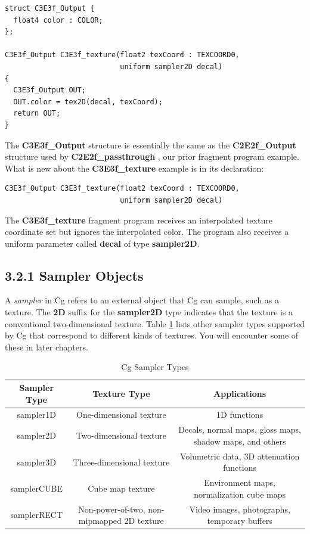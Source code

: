 \documentclass{book}
\begin{document}
\FloatBarrier
\begin{lstlisting}[caption=Example 3-3. The \textbf{C3E3f_texture} Fragment Program]
struct C3E3f_Output {
  float4 color : COLOR;
};

C3E3f_Output C3E3f_texture(float2 texCoord : TEXCOORD0,
                           uniform sampler2D decal)
{
  C3E3f_Output OUT;
  OUT.color = tex2D(decal, texCoord);
  return OUT;
}
\end{lstlisting}
\FloatBarrier

The \textbf{C3E3f_Output} structure is essentially the same as the \textbf{C2E2f_Output} structure used by \textbf{C2E2f_passthrough} , our prior fragment program example. What is new about the \textbf{C3E3f_texture} example is in its declaration:

\FloatBarrier
\begin{lstlisting}
C3E3f_Output C3E3f_texture(float2 texCoord : TEXCOORD0,
                           uniform sampler2D decal)
\end{lstlisting}
\FloatBarrier

The \textbf{C3E3f_texture} fragment program receives an interpolated texture coordinate set but ignores the interpolated color. The program also receives a uniform parameter called \textbf{decal} of type \textbf{sampler2D}.

\subsection{3.2.1 Sampler Objects}

A \textit{sampler} in Cg refers to an external object that Cg can sample, such as a texture. The \textbf{2D} suffix for the \textbf{sampler2D} type indicates that the texture is a conventional two-dimensional texture. Table \ref{table:3-1} lists other sampler types supported by Cg that correspond to different kinds of textures. You will encounter some of these in later chapters.

\begin{table}
\centering
\begin{tabular}{ |c|c|c| } 
 \hline
Sampler Type & Texture Type & Applications \\
\hline
sampler1D & One-dimensional texture & 1D functions \\
sampler2D & Two-dimensional texture & Decals, normal maps, gloss maps, shadow maps, and others \\
sampler3D & Three-dimensional texture & Volumetric data, 3D attenuation functions \\
samplerCUBE & Cube map texture & Environment maps, normalization cube maps \\
samplerRECT & Non-power-of-two, non-mipmapped 2D texture & Video images, photographs, temporary buffers \\
 \hline
\end{tabular}
\caption{Cg Sampler Types}
\label{table:3-1}
\end{table}
\end{document}
